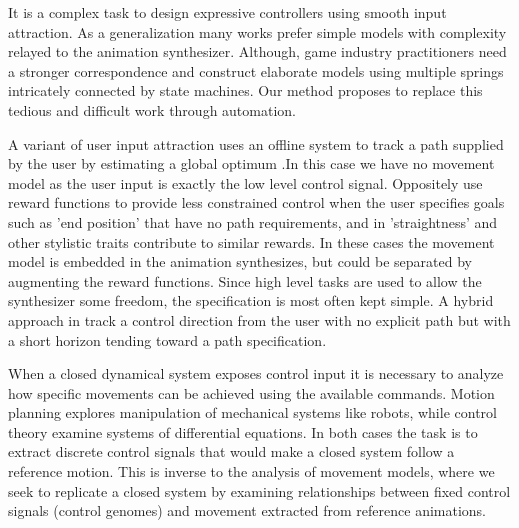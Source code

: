 It is a complex task to design expressive controllers using smooth input attraction. As a generalization many works prefer simple models with complexity relayed to the animation synthesizer. Although, game industry practitioners need a stronger correspondence and construct elaborate models using multiple springs intricately connected by state machines. Our method proposes to replace this tedious and difficult work through automation. 

A variant of user input attraction uses an offline system to track a path supplied by the user by estimating a global optimum \citep{lee03,safanona07,treuille07}.In this case we have no movement model as the user input is exactly the low level control signal. Oppositely \citep{kovar02} use reward functions to provide less constrained control when the user specifies goals such as 'end position' that have no path requirements, and in \citep{lee18} 'straightness' and other stylistic traits contribute to similar rewards. In these cases the movement model is embedded in the animation synthesizes, but could be separated by augmenting the reward functions. Since high level tasks are used to allow the synthesizer some freedom, the specification is most often kept simple. A hybrid approach in \citep{lee10} track a control direction from the user with no explicit path but with a short horizon tending toward a path specification.

When a closed dynamical system exposes control input it is necessary to analyze how specific movements can be achieved using the available commands. Motion planning explores manipulation of mechanical systems like robots, while control theory examine systems of differential equations. In both cases the task is to extract discrete control signals that would make a closed system follow a reference motion. This is inverse to the analysis of movement models, where we seek to replicate a closed system by examining relationships between fixed control signals (control genomes) and movement extracted from reference animations. 

